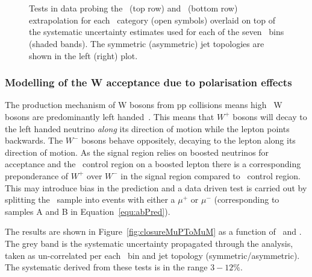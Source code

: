 \begin{figure}[h!]
  \begin{center}
    ~~
    \\
    ~~

    \caption{Tests in data probing the \alphat~(top row) and \bdphi~(bottom row) extrapolation for each
      \njet~category (open symbols) overlaid on top of the systematic
      uncertainty estimates used for each of the seven \scalht~bins (shaded bands). 
      The symmetric (asymmetric) jet topologies are shown in the left (right) plot. 
    }
    \label{fig:closureAlphaT}
  \end{center} 
\end{figure}
\subsubsection{Modelling of the W acceptance due to polarisation effects}

The production mechanism of W bosons from pp collisions means high \pt~W bosons are predominantly left 
handed~\cite{lhW}. This means that $W^{+}$ bosons will decay to the left handed neutrino \emph{along}
its direction of motion while the lepton points backwards. The $W^{-}$ bosons behave oppositely, decaying
to the lepton along its direction of motion. As the signal region relies on boosted neutrinos 
for acceptance and the \mj~control region on a boosted lepton there is a corresponding preponderance
of $W^{+}$ over $W^{-}$ in the signal region compared to \mj~control region. This may introduce bias
in the prediction and a data driven test is carried out by splitting the \mj~sample into events 
with either a $\mu^{+}$ or $\mu^{-}$ (corresponding to samples A and B in Equation~\ref{equ:abPred}).

The results are shown in Figure~\ref{fig:closureMuPToMuM} as a function of \scalht~and \njet. 
The grey band is the systematic uncertainty propagated through the analysis, 
taken as un-correlated per each \scalht~bin and jet topology (symmetric/asymmetric).
The systematic derived from these tests is in the range $3-12\%$.



